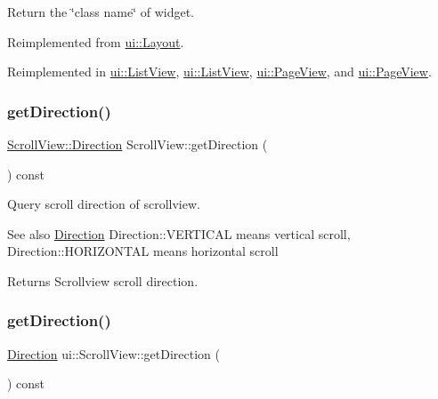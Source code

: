Return the \char`\"{}class name\char`\"{} of widget. 

Reimplemented from \hyperlink{classui_1_1Layout_a3fdf14a50462dff31ec875b28e223c7f}{ui\+::\+Layout}.



Reimplemented in \hyperlink{classui_1_1ListView_a921a755d9787f976af9424ceb16a1aa3}{ui\+::\+List\+View}, \hyperlink{classui_1_1ListView_a653bb454095ef227949f7c791b68180c}{ui\+::\+List\+View}, \hyperlink{classui_1_1PageView_aead0575c0e5d24da3731501afadf81e9}{ui\+::\+Page\+View}, and \hyperlink{classui_1_1PageView_a3c9b2934fdbbb44e2c456feee27b53de}{ui\+::\+Page\+View}.

\mbox{\label{classui_1_1ScrollView_a9ab2bc7f51dfbfbacce0b2f25f47c680}} 
\subsubsection{\texorpdfstring{get\+Direction()}{getDirection()}\hspace{0.1cm}{\footnotesize\ttfamily [1/2]}}
{\footnotesize\ttfamily \hyperlink{classui_1_1ScrollView_aed2d778ae8098dcafe323b2beae8dd6b}{Scroll\+View\+::\+Direction} Scroll\+View\+::get\+Direction (\begin{DoxyParamCaption}{ }\end{DoxyParamCaption}) const}

Query scroll direction of scrollview.

\begin{DoxySeeAlso}{See also}
{\ttfamily \hyperlink{classui_1_1ScrollView_aed2d778ae8098dcafe323b2beae8dd6b}{Direction}} Direction\+::\+V\+E\+R\+T\+I\+C\+AL means vertical scroll, Direction\+::\+H\+O\+R\+I\+Z\+O\+N\+T\+AL means horizontal scroll
\end{DoxySeeAlso}
\begin{DoxyReturn}{Returns}
Scrollview scroll direction. 
\end{DoxyReturn}
\mbox{\label{classui_1_1ScrollView_a87326abd42ff586b903b060ab9bc49a2}} 
\subsubsection{\texorpdfstring{get\+Direction()}{getDirection()}\hspace{0.1cm}{\footnotesize\ttfamily [2/2]}}
{\footnotesize\ttfamily \hyperlink{classui_1_1ScrollView_aed2d778ae8098dcafe323b2beae8dd6b}{Direction} ui\+::\+Scroll\+View\+::get\+Direction (\begin{DoxyParamCaption}{ }\end{DoxyParamCaption}) const}

